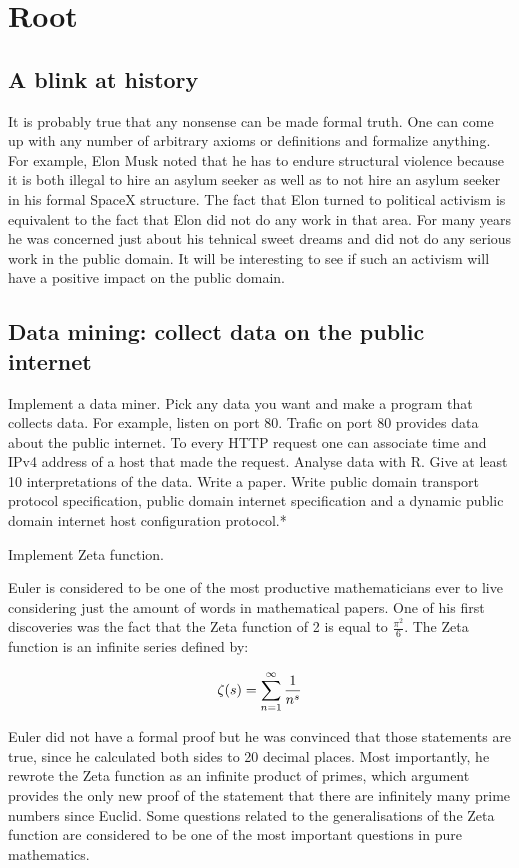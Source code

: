 \documentclass{article}
\begin{document}
\section*{Root}

\subsection*{A blink at history}
It is probably true that any nonsense can be made formal truth. One can come up
with any number of arbitrary axioms or definitions and formalize anything. For
example, Elon Musk noted that he has to endure structural violence because it is
both illegal to hire an asylum seeker as well as to not hire an asylum seeker
in his formal SpaceX structure. The fact that Elon turned to political activism
is equivalent to the fact that Elon did not do any work in that area. For many
years he was concerned just about his tehnical sweet dreams and did not do any
serious work in the public domain. It will be interesting to see if such an
activism will have a positive impact on the public domain. 

\subsection*{Data mining: collect data on the public internet}
Implement a data miner. Pick any data you want and make a program that collects
data. For example, listen on port 80. Trafic on port 80 provides data about the
public internet. To every HTTP request one can associate
time and IPv4 address of a host that made the request. Analyse data with R.
Give at least 10 interpretations of the data. Write a paper. Write public domain
transport protocol specification, public domain internet specification and a
dynamic public domain internet host configuration protocol.* 

Implement Zeta function.

Euler is considered to be one of the most productive mathematicians ever to
live considering just the amount of words in mathematical papers. One
of his first discoveries was the fact that the Zeta function of 2 is equal to
$\frac{\pi^2}{6}$. The Zeta function is an infinite series defined by:

\[
\zeta(s) = \sum_{n=1}^{\infty} \frac{1}{n^{s}}$$
\] 

Euler did not have a formal proof but he was convinced that those statements
are true, since he calculated both sides to 20 decimal places. Most importantly,
he rewrote the Zeta function as an infinite product of primes, which argument
provides the only new proof of the statement that there are infinitely many prime
numbers since Euclid. Some questions related to the generalisations of the Zeta
function are considered to be one of the most important questions in pure
mathematics. 
\end{document}
